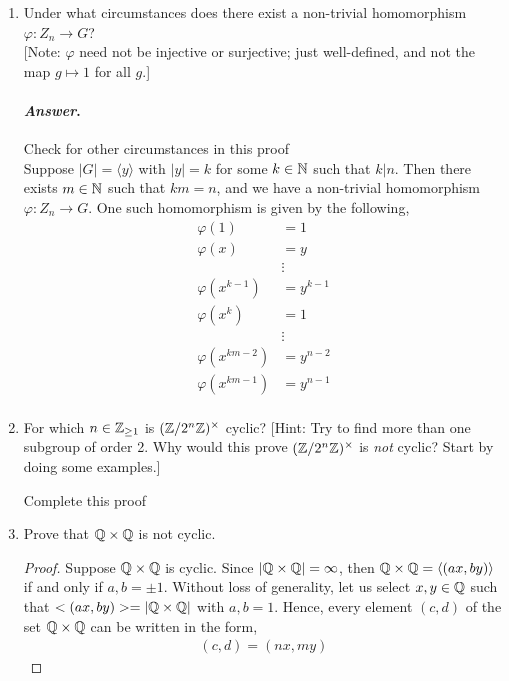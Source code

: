 \documentclass[11pt, reqno]{amsart}
\theoremstyle{plain}
\theoremstyle{definition}
\theoremstyle{example}
\newenvironment{ans}{\color{black}\medskip \paragraph*{\emph{Answer}.}}{\hfill \break  $~\!\!$ \dotfill \medskip }
\newcommand{\NOTE}[1]{{\color{red}#1}}
\def\<{\langle} \def\>{\rangle}
\def\f{\varphi}
\begin{document}
\begin{enumerate}[1.]
\begin{enumerate}
\begin{proof} \NOTE{Complete this proof}\\
Suppose that $\sigma_a$ is an automorphism of $Z_n$ and suppose $(a, n) = k \neq 1$.
\end{proof} 
\item Under what circumstances does there exist a non-trivial homomorphism $\f: Z_n \to G$? \\{\small[Note: $\f$ need not be injective or surjective; just well-defined, and not the map $g \mapsto 1$ for all $g$.]}
\begin{ans} \NOTE{Check for other circumstances in this proof}\\
Suppose $|G| = \<y\>$ with $|y| = k$ for some $k \in \mathbb{N}$ such that $k | n$. Then there exists $m \in \mathbb{N}$ such that $km = n$, and we have a non-trivial homomorphism $\varphi: Z_n \to G$. One such homomorphism is given by the following,
\begin{align*}
\varphi(1) &= 1\\
\varphi(x) &= y\\
&\vdots\\
\varphi(x^{k-1}) &= y^{k-1}\\
\varphi(x^k) &= 1\\
&\vdots\\
\varphi(x^{km-2}) &= y^{n-2}\\
\varphi(x^{km-1}) &= y^{n-1}\\
\end{align*}
\end{ans}

\item For which $n \in \mathbb{Z}_{\ge 1}$ is $(\mathbb{Z}/2^n\mathbb{Z})^\times$ cyclic? \hfill {\small[Hint: Try to find more than one subgroup of order 2. Why would this prove $(\mathbb{Z}/2^n\mathbb{Z})^\times$ is \emph{not} cyclic? Start by doing some examples.]}

\NOTE{Complete this proof}\\ 

\item Prove that $\mathbb{Q} \times \mathbb{Q}$ is not cyclic.
\begin{proof} 
Suppose $\mathbb{Q} \times \mathbb{Q}$ is cyclic. Since $|\mathbb{Q} \times \mathbb{Q}| = \infty$, then $\QQ \times \QQ = \<(ax, by)\>$ if and only if $a, b = \pm 1$. Without loss of generality, let us select $x, y \in \mathbb{Q}$ such that $<(ax, by)> = |\mathbb{Q} \times \mathbb{Q}|$ with $a, b = 1$. Hence, every element $(c, d)$ of the set $\mathbb{Q} \times \mathbb{Q}$ can be written in the form,
\begin{align*}
(c, d) = (nx, my)
\end{align*}


\end{proof}
\end{enumerate}
\end{enumerate}
\end{document}
